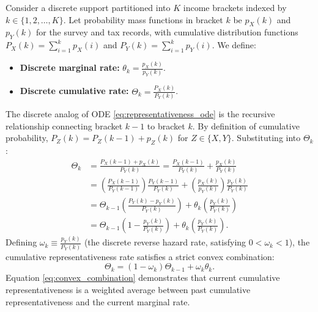 \begin{definition}
Consider a discrete support partitioned into $K$ income brackets indexed by $k \in \{1, 2, \dots, K\}$. Let probability mass functions in bracket $k$ be $p_X(k)$ and $p_Y(k)$ for the survey and tax records, with cumulative distribution functions $P_X(k) = \sum_{i=1}^k p_X(i)$ and $P_Y(k) = \sum_{i=1}^k p_Y(i)$. We define:
\begin{itemize}
    \item \textbf{Discrete marginal rate:} $\theta_k = \frac{p_X(k)}{p_Y(k)}$.
    \item \textbf{Discrete cumulative rate:} $\Theta_k = \frac{P_X(k)}{P_Y(k)}$.
\end{itemize}
\end{definition}

The discrete analog of ODE \eqref{eq:representativeness_ode} is the recursive relationship connecting bracket $k-1$ to bracket $k$. By definition of cumulative probability, $P_Z(k) = P_Z(k-1) + p_Z(k)$ for $Z \in \{X, Y\}$. Substituting into $\Theta_k$:
\begin{align*}
    \Theta_k &= \frac{P_X(k-1) + p_X(k)}{P_Y(k)} = \frac{P_X(k-1)}{P_Y(k)} + \frac{p_X(k)}{P_Y(k)} \\
    &= \left( \frac{P_X(k-1)}{P_Y(k-1)} \right) \frac{P_Y(k-1)}{P_Y(k)} + \left( \frac{p_X(k)}{p_Y(k)} \right) \frac{p_Y(k)}{P_Y(k)} \\
    &= \Theta_{k-1} \left( \frac{P_Y(k) - p_Y(k)}{P_Y(k)} \right) + \theta_k \left( \frac{p_Y(k)}{P_Y(k)} \right) \\
    &= \Theta_{k-1} \left( 1 - \frac{p_Y(k)}{P_Y(k)} \right) + \theta_k \left( \frac{p_Y(k)}{P_Y(k)} \right).
\end{align*}
Defining $\omega_k \equiv \frac{p_Y(k)}{P_Y(k)}$ (the discrete reverse hazard rate, satisfying $0 < \omega_k < 1$), the cumulative representativeness rate satisfies a strict convex combination:
\begin{equation}
    \Theta_k = (1 - \omega_k)\Theta_{k-1} + \omega_k \theta_k.
    \label{eq:convex_combination}
\end{equation}
Equation \eqref{eq:convex_combination} demonstrates that current cumulative representativeness is a weighted average between past cumulative representativeness and the current marginal rate.

